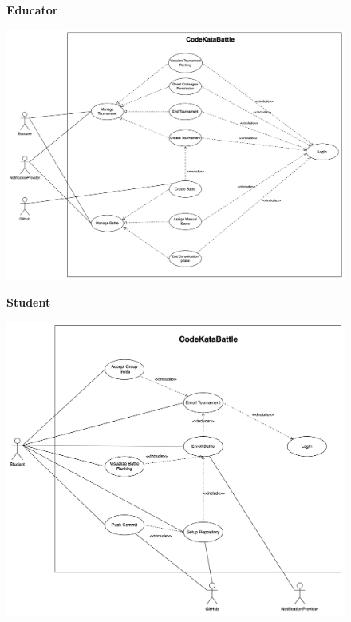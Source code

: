 \documentclass{Configuration_Files/Template}
\begin{document}
\begin{figure}[H]
\textbf{Educator}\par\medskip
\includegraphics[scale = 0.45]{Images/UseCaseDiagrams/EducatorUseCaseDiagram.png}\\
\centering
\end{figure}
\begin{figure}[H]
\textbf{Student}\par\medskip
\includegraphics[scale = 0.45]{Images/UseCaseDiagrams/StudentUseCaseDiagram.png}\\
\centering
\end{figure}
\end{document}
